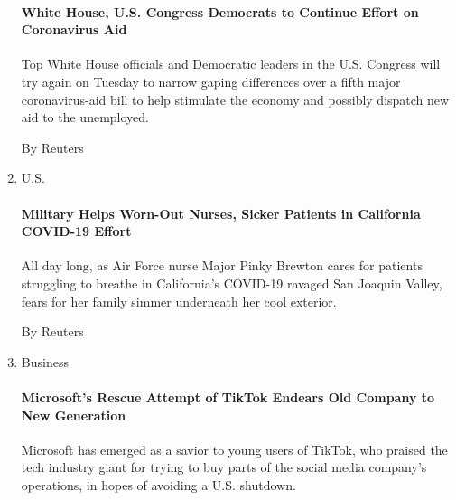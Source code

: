 \begin{enumerate}
  \hypertarget{white-house-us-congress-democrats-to-continue-effort-on-coronavirus-aid}{%
  \paragraph{White House, U.S. Congress Democrats to Continue Effort on
  Coronavirus
  Aid}\label{white-house-us-congress-democrats-to-continue-effort-on-coronavirus-aid}}

  Top White House officials and Democratic leaders in the U.S. Congress
  will try again on Tuesday to narrow gaping differences over a fifth
  major coronavirus-aid bill to help stimulate the economy and possibly
  dispatch new aid to the unemployed.

  By Reuters
\item
  U.S.

  \href{/reuters/2020/08/04/us/04reuters-health-coronavirus-usa-military-feature.html?searchResultPosition=7}{}

  \hypertarget{military-helps-worn-out-nurses-sicker-patients-in-california-covid-19-effort}{%
  \paragraph{Military Helps Worn-Out Nurses, Sicker Patients in
  California COVID-19
  Effort}\label{military-helps-worn-out-nurses-sicker-patients-in-california-covid-19-effort}}

  All day long, as Air Force nurse Major Pinky Brewton cares for
  patients struggling to breathe in California's COVID-19 ravaged San
  Joaquin Valley, fears for her family simmer underneath her cool
  exterior.

  By Reuters
\item
  Business

  \href{/reuters/2020/08/04/business/04reuters-usa-tiktok-minecraft.html?searchResultPosition=8}{}

  \hypertarget{microsofts-rescue-attempt-of-tiktok-endears-old-company-to-new-generation}{%
  \paragraph{Microsoft's Rescue Attempt of TikTok Endears Old Company to
  New
  Generation}\label{microsofts-rescue-attempt-of-tiktok-endears-old-company-to-new-generation}}

  Microsoft has emerged as a savior to young users of TikTok, who
  praised the tech industry giant for trying to buy parts of the social
  media company's operations, in hopes of avoiding a U.S. shutdown.


\end{enumerate}
